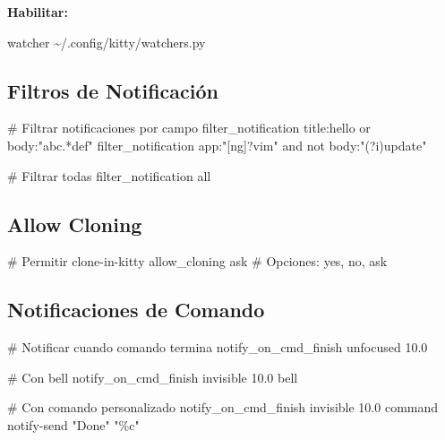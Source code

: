 \documentclass[
  doc,
  floatsintext,
  longtable,
  a4paper,
  nolmodern,
  notxfonts,
  notimes,
  12pt,
  colorlinks=true,linkcolor=blue,citecolor=blue,urlcolor=blue]{apa7}
\newenvironment{Shaded}{\begin{snugshade}}{\end{snugshade}}
\newcommand{\CommentTok}[1]{\textcolor[rgb]{0.37,0.37,0.37}{#1}}
\newcommand{\DataTypeTok}[1]{\textcolor[rgb]{0.68,0.00,0.00}{#1}}
\newcommand{\ErrorTok}[1]{\textcolor[rgb]{0.68,0.00,0.00}{#1}}
\begin{document}
\textbf{Habilitar:}

\begin{Shaded}
\begin{Highlighting}[]
\DataTypeTok{watcher} \ErrorTok{\textasciitilde{}/}\DataTypeTok{.config}\ErrorTok{/}\DataTypeTok{kitty}\ErrorTok{/}\DataTypeTok{watchers.py}
\end{Highlighting}
\end{Shaded}

\subsection{Filtros de Notificación}\label{filtros-de-notificaciuxf3n}

\begin{Shaded}
\begin{Highlighting}[]
\CommentTok{\# Filtrar notificaciones por campo}
\DataTypeTok{filter\_notification} \DataTypeTok{title}\ErrorTok{:}\DataTypeTok{hello} \DataTypeTok{or} \DataTypeTok{body}\ErrorTok{:}\DataTypeTok{"abc.*def"}
\DataTypeTok{filter\_notification} \DataTypeTok{app}\ErrorTok{:}\DataTypeTok{"[ng]?vim"} \DataTypeTok{and} \DataTypeTok{not} \DataTypeTok{body}\ErrorTok{:}\DataTypeTok{"(?i)update"}

\CommentTok{\# Filtrar todas}
\DataTypeTok{filter\_notification} \DataTypeTok{all}
\end{Highlighting}
\end{Shaded}

\subsection{Allow Cloning}\label{allow-cloning}

\begin{Shaded}
\begin{Highlighting}[]
\CommentTok{\# Permitir clone{-}in{-}kitty}
\DataTypeTok{allow\_cloning} \DataTypeTok{ask}
\CommentTok{\# Opciones: yes, no, ask}
\end{Highlighting}
\end{Shaded}

\subsection{Notificaciones de Comando}\label{notificaciones-de-comando}

\begin{Shaded}
\begin{Highlighting}[]
\CommentTok{\# Notificar cuando comando termina}
\DataTypeTok{notify\_on\_cmd\_finish} \DataTypeTok{unfocused} \DataTypeTok{10.0}

\CommentTok{\# Con bell}
\DataTypeTok{notify\_on\_cmd\_finish} \DataTypeTok{invisible} \DataTypeTok{10.0} \DataTypeTok{bell}

\CommentTok{\# Con comando personalizado}
\DataTypeTok{notify\_on\_cmd\_finish} \DataTypeTok{invisible} \DataTypeTok{10.0} \DataTypeTok{command} \DataTypeTok{notify{-}send} \DataTypeTok{"Done"} \DataTypeTok{"\%c"}
\end{Highlighting}
\end{Shaded}
\end{document}
